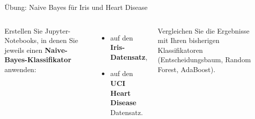 \begin{frame}{Übung: Naive Bayes für Iris und Heart Disease}
\begin{columns}
Erstellen Sie Jupyter-Notebooks, in denen Sie jeweils einen \textbf{Naive-%
Bayes-Klassifikator} anwenden:

\vspace{0.4em}
\begin{itemize}
  \item auf den \textbf{Iris-Datensatz},
  \item auf den \textbf{UCI Heart Disease} Datensatz.
\end{itemize}

\vspace{0.4em}
Vergleichen Sie die Ergebnisse mit Ihren bisherigen Klassifikatoren
(Entscheidungsbaum, Random Forest, AdaBoost).

\centering
{}
\end{columns}
\end{frame}

\makequestionspage{\FRAGENIMAGE}